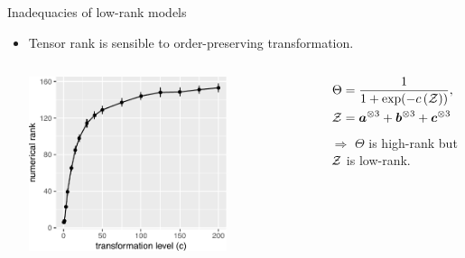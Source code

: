 \documentclass[10pt, mathserif]{beamer} %
\theoremstyle{definition}
\theoremstyle{plain}
\begin{document}
\begin{frame}{Inadequacies of  low-rank models}
 \begin{itemize}         
  \item Tensor rank is sensible to order-preserving transformation.
\begin{columns}
\begin{column}{0.5\textwidth}
   \begin{center}
     \includegraphics[width=0.7\textwidth]{Figures/example1.pdf}
     \end{center}
\end{column}
\begin{column}{0.6\textwidth} 
\begin{align}
\Theta &= {1\over 1+\exp(-c\left(\mathcal{Z}\right))},\quad\text{where }\\ 
\mathcal{Z} &= \bm a^{\otimes3}+ \bm b^{\otimes3}+ \bm c^{\otimes3}
\end{align}
$\Rightarrow$ $\Theta$ is high-rank but $\mathcal{Z}$ is low-rank. 
\end{column}
\end{columns}
      
   \pause   
   

\end{itemize}
\end{frame}
\end{document}
